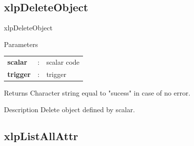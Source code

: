 \subsection{xlpDeleteObject}

\begin{xlpfunctitle}{xlpDeleteObject}

\begin{xlpfunc}{Parameters}
\begin{tabular}{p{3.5cm}cl}
\textbf{scalar}& : & scalar code \\
\textbf{trigger}& : & trigger 
\end{tabular}
\end{xlpfunc}


\begin{xlpfunc}{Returns}
Character string equal to "sucess" in case of no error.
\end{xlpfunc}

\begin{xlpfunc}{Description}
Delete object defined by scalar.
\end{xlpfunc}

\end{xlpfunctitle}

\subsection{xlpListAllAttr}

